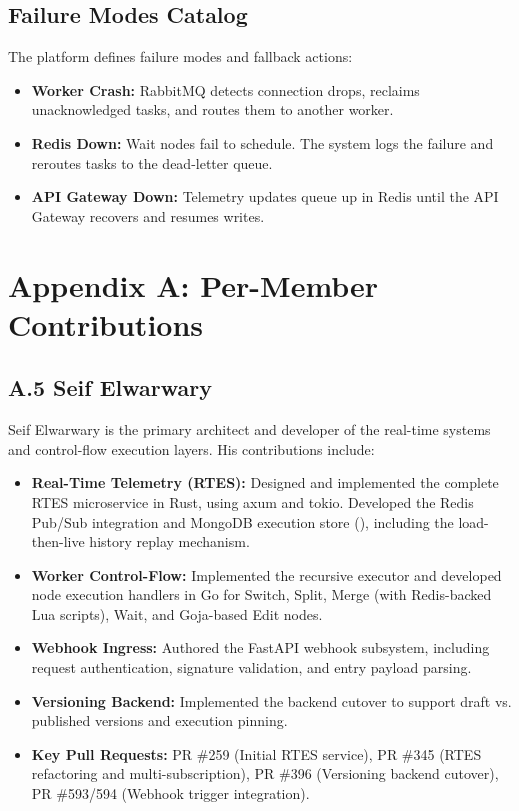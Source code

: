 \documentclass[12pt]{report}
\begin{document}
\section{Failure Modes Catalog}
The platform defines failure modes and fallback actions:
\begin{itemize}
    \item \textbf{Worker Crash:} RabbitMQ detects connection drops, reclaims unacknowledged tasks, and routes them to another worker.
    \item \textbf{Redis Down:} Wait nodes fail to schedule. The system logs the failure and reroutes tasks to the dead-letter queue.
    \item \textbf{API Gateway Down:} Telemetry updates queue up in Redis until the API Gateway recovers and resumes writes.
\end{itemize}

\chapter*{Appendix A: Per-Member Contributions}

\section*{A.5 Seif Elwarwary}
Seif Elwarwary is the primary architect and developer of the real-time systems and control-flow execution layers. His contributions include:
\begin{itemize}
    \item \textbf{Real-Time Telemetry (RTES):} Designed and implemented the complete RTES microservice in Rust, using axum and tokio. Developed the Redis Pub/Sub integration and MongoDB execution store (), including the load-then-live history replay mechanism.
    \item \textbf{Worker Control-Flow:} Implemented the recursive executor and developed node execution handlers in Go for Switch, Split, Merge (with Redis-backed Lua scripts), Wait, and Goja-based Edit nodes.
    \item \textbf{Webhook Ingress:} Authored the FastAPI webhook subsystem, including request authentication, signature validation, and entry payload parsing.
    \item \textbf{Versioning Backend:} Implemented the backend cutover to support draft vs. published versions and execution pinning.
    \item \textbf{Key Pull Requests:} PR \#259 (Initial RTES service), PR \#345 (RTES refactoring and multi-subscription), PR \#396 (Versioning backend cutover), PR \#593/594 (Webhook trigger integration).
\end{itemize}
\end{document}
